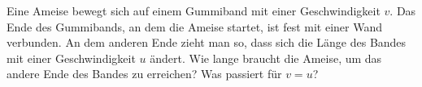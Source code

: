 \begin{Exercise}[label = moveant, origin = Jaan Kalda, difficulty = 4, title = Ameise auf dem Laufband]
	Eine Ameise bewegt sich auf einem Gummiband mit einer Geschwindigkeit $v$. Das Ende des Gummibands, an dem die Ameise startet, ist fest mit einer Wand verbunden. An dem anderen Ende zieht man so, dass sich die Länge des Bandes mit einer Geschwindigkeit $u$ ändert. Wie lange braucht die Ameise, um das andere Ende des Bandes zu erreichen? Was passiert für $v=u$?
\end{Exercise}